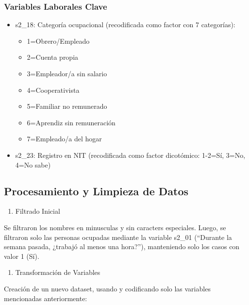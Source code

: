 \documentclass[Royal,times,sageh]{sagej}
\providecommand{\tightlist}{%
  \setlength{\itemsep}{0pt}\setlength{\parskip}{0pt}}
\begin{document}
\subsubsection{Variables Laborales
Clave}\label{variables-laborales-clave}

\begin{itemize}
\item
  s2\_18: Categoría ocupacional (recodificada como factor con 7
  categorías):

  \begin{itemize}
  \item
    1=Obrero/Empleado
  \item
    2=Cuenta propia
  \item
    3=Empleador/a sin salario
  \item
    4=Cooperativista
  \item
    5=Familiar no remunerado
  \item
    6=Aprendiz sin remuneración
  \item
    7=Empleado/a del hogar
  \end{itemize}
\item
  s2\_23: Registro en NIT (recodificada como factor dicotómico: 1-2=Sí,
  3=No, 4=No sabe)
\end{itemize}

\subsection{Procesamiento y Limpieza de
Datos}\label{procesamiento-y-limpieza-de-datos}

\begin{enumerate}
\def\labelenumi{\arabic{enumi}.}
\tightlist
\item
  Filtrado Inicial
\end{enumerate}

Se filtraron los nombres en minusculas y sin caracters especiales.
Luego, se filtraron solo las personas ocupadas mediante la variable
s2\_01 (``Durante la semana pasada, ¿trabajó al menos una hora?''),
manteniendo solo los casos con valor 1 (Sí).

\begin{enumerate}
\def\labelenumi{\arabic{enumi}.}
\setcounter{enumi}{1}
\tightlist
\item
  Transformación de Variables
\end{enumerate}

Creación de un nuevo dataset, usando y codificando solo las variables
mencionadas anteriormente:
\end{document}
